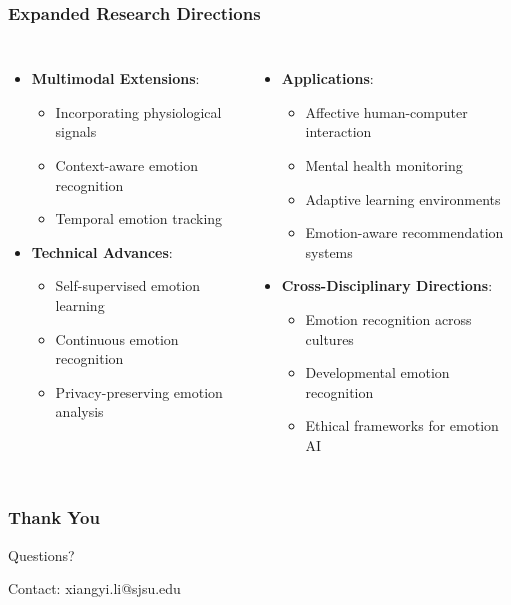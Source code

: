 \begin{frame}
\frametitle{Expanded Research Directions}
\begin{columns}
\begin{itemize}
    \item \textbf{Multimodal Extensions}:
    \begin{itemize}
        \item Incorporating physiological signals
        \item Context-aware emotion recognition
        \item Temporal emotion tracking
    \end{itemize}
    \item \textbf{Technical Advances}:
    \begin{itemize}
        \item Self-supervised emotion learning
        \item Continuous emotion recognition
        \item Privacy-preserving emotion analysis
    \end{itemize}
\end{itemize}

\begin{itemize}
    \item \textbf{Applications}:
    \begin{itemize}
        \item Affective human-computer interaction
        \item Mental health monitoring
        \item Adaptive learning environments
        \item Emotion-aware recommendation systems
    \end{itemize}
    \item \textbf{Cross-Disciplinary Directions}:
    \begin{itemize}
        \item Emotion recognition across cultures
        \item Developmental emotion recognition
        \item Ethical frameworks for emotion AI
    \end{itemize}
\end{itemize}
\end{columns}
\end{frame}

\begin{frame}
\frametitle{Thank You}
\begin{center}
\LARGE{Questions?}

\vspace{1cm}
\normalsize
Contact: xiangyi.li@sjsu.edu
\end{center}
\end{frame}

